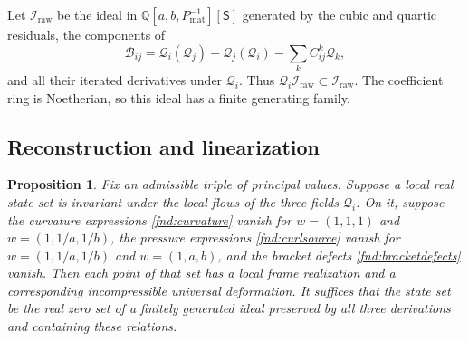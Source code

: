 \documentclass[11pt,a4paper]{article}
\numberwithin{equation}{section}
\theoremstyle{plain}
\newtheorem{proposition}[theorem]{Proposition}
\theoremstyle{definition}
\theoremstyle{remark}
\begin{document}
Let $\mathscr I_{\mathrm{raw}}$ be the ideal in
$\mathbb Q[a,b,P_{\mathrm{mat}}^{-1}][\mathsf S]$ generated by the cubic and quartic
residuals, the components of
\begin{equation}\label{fnd:bracketdefects}
\mathcal B_{ij}=\mathcal Q_i(\mathcal Q_j)-\mathcal Q_j(\mathcal Q_i)
-\sum_kC^k_{ij}\mathcal Q_k,
\end{equation}
and all their iterated derivatives under $\mathcal Q_i$. Thus
$\mathcal Q_i\mathscr I_{\mathrm{raw}}\subset\mathscr I_{\mathrm{raw}}$.
The coefficient ring is Noetherian, so this ideal has a finite generating
family.

\subsection{Reconstruction and linearization}
\begin{proposition}\label{fnd:reconstruction}
Fix an admissible triple of principal values. Suppose a local real state
set is invariant under the local flows of the three fields $\mathcal Q_i$.
On it, suppose the curvature expressions \eqref{fnd:curvature} vanish for
$w=(1,1,1)$ and $w=(1,1/a,1/b)$, the pressure expressions
\eqref{fnd:curlsource} vanish for $w=(1,1/a,1/b)$ and $w=(1,a,b)$,
and the bracket defects \eqref{fnd:bracketdefects} vanish.
Then each point of that set has a local frame realization and a
corresponding incompressible universal deformation. It suffices
that the state set be the real zero set of a finitely generated ideal
preserved by all three derivations and containing these relations.
\end{proposition}
\end{document}
